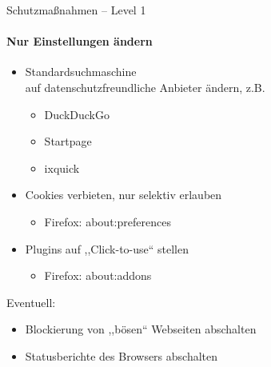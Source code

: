   \begin{frame}{Schutzmaßnahmen -- Level 1}
  \framesubtitle{Nur Einstellungen ändern}
    \begin{itemize}
      \item Standardsuchmaschine\\ auf datenschutzfreundliche Anbieter ändern, z.B.
      \begin{itemize}
        \item DuckDuckGo
        \item Startpage
        \item ixquick
      \end{itemize}
      \item Cookies verbieten, nur selektiv erlauben
      \begin{itemize}
        \item Firefox: about:preferences
      \end{itemize}
      \item Plugins auf ,,Click-to-use`` stellen
      \begin{itemize}
        \item Firefox: about:addons
      \end{itemize}
    \end{itemize}

    Eventuell:
    \begin{itemize}
      \item Blockierung von ,,bösen`` Webseiten abschalten
      \item Statusberichte des Browsers abschalten
    \end{itemize}
  \end{frame}

